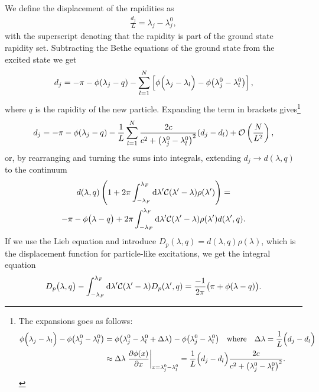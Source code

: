 \documentclass[11pt, a4paper]{report} %
\begin{document}
We define the displacement of the rapidities as~\cite{Caux2015}
\begin{align}
  \label{eq:24}
  \frac{d_j}{L} = \lambda_j - \lambda_j^0,
\end{align}
with the superscript denoting that the rapidity is part of the ground state rapidity set.
Subtracting the Bethe equations of the ground state from the excited state we get~\cite{Franchini2017,Caux2015}
\begin{align}
  \label{eq:25}
   d_j = - \pi - \phi\qty(\lambda_j-q) - \sum_{l=1}^{N} \left[\phi\qty\Big(\lambda_j - \lambda_l) - \phi\qty(\lambda_j^0-\lambda_l^0)\right],
\end{align}
where \(q\) is the rapidity of the new particle.
Expanding the term in brackets gives\footnote{The expansions goes as follows:
  \begin{align*}
    \phi\qty\Big(\lambda_j-\lambda_l) - \phi\qty(\lambda_j^0 - \lambda_l^0) &= \phi\qty(\lambda_j^0 - \lambda_l^0 + \Delta\lambda) - \phi\qty(\lambda_j^0 - \lambda_l^0) \quad \mathrm{where}\quad \Delta \lambda = \frac{1}{L}\qty\Big(d_j - d_l)\\
    &\approx\Delta \lambda \eval{\frac{\partial\phi(x)}{\partial x}}_{x = \lambda_j^0-\lambda_l^0}
    = \frac{1}{L}\qty\Big(d_j-d_l) \frac{2c}{c^2 + {\qty(\lambda_j^0-\lambda_l^0)}^2}.
  \end{align*}
}
\begin{align}
  \label{eq:27}
  d_j = -\pi - \phi\qty(\lambda_j-q) - \frac{1}{L} \sum_{l=1}^N \frac{2c}{c^2 + {\qty(\lambda_j^0-\lambda_l^0)}^2} \qty(d_j-d_l) + \mathcal{O}\left(\frac{N}{L^2}\right),
\end{align}
or, by rearranging and turning the sums into integrals, extending \(d_j\to d(\lambda,q)\) to the continuum
\begin{multline}
  \label{eq:28}
  d(\lambda,q) \left(1+2\pi \int_{-\lambda_F}^{\lambda_F} \dd \lambda'\mathcal{C}\qty(\lambda'-\lambda)\rho\qty(\lambda')\right) = \\-\pi -\phi\qty\big(\lambda-q) + 2\pi \int_{-\lambda_F}^{\lambda_F} \dd \lambda' \mathcal{C}\qty(\lambda'-\lambda) \rho\qty(\lambda') d\qty(\lambda',q).
\end{multline}
If we use the Lieb equation and introduce \(D_p(\lambda,q)=d(\lambda,q)\rho(\lambda)\), which is the displacement function for particle-like excitations, we get the integral equation~\cite{Caux2015,Franchini2017}
\begin{align}
  \label{eq:partdisplacement}
  D_p\qty\big(\lambda,q) - \int_{-\lambda_F}^{\lambda_F} \dd \lambda' \mathcal{C}\qty(\lambda'-\lambda) D_p\qty(\lambda', q) = \frac{-1}{2\pi} \qty\big(\pi+\phi(\lambda-q)).
\end{align}
\end{document}
